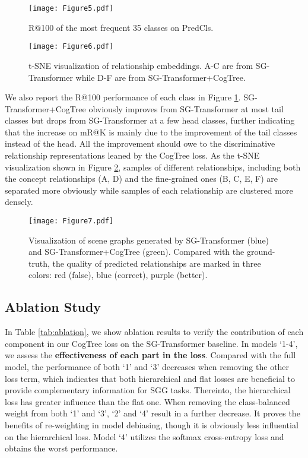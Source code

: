 \documentclass[letterpaper]{article} \usepackage{aaai21}  \usepackage{times}  \usepackage{helvet} \usepackage{courier}  \usepackage[hyphens]{url}  \usepackage{graphicx} \urlstyle{rm} \def\UrlFont{\rm}  \usepackage{natbib}  \usepackage{caption} \frenchspacing  \setlength{\pdfpagewidth}{8.5in}  \setlength{\pdfpageheight}{11in}  \usepackage{amsmath,amsthm}
\begin{document}
\begin{figure}[t]
    \centering
    \texttt{[image: Figure5.pdf]}
    \caption{R@100 of the most frequent 35 classes on PredCls.}
    \label{fig:recall}
\end{figure}

\begin{figure}[t]
    \centering
    \texttt{[image: Figure6.pdf]}
    \caption{t-SNE visualization of relationship embeddings. A-C are from SG-Transformer while D-F are from SG-Transformer+CogTree.}
    \label{fig:tsne}
\end{figure}


We also report the R@100 performance of each class in Figure \ref{fig:recall}. SG-Transformer+CogTree obviously improves from SG-Transformer at most tail classes but drops from SG-Transformer at a few head classes, further indicating that the increase on mR@K is mainly due to the improvement of the tail classes instead of the head. All the improvement should owe to the discriminative relationship representations leaned by the CogTree loss. As the t-SNE visualization shown in Figure \ref{fig:tsne}, samples of different relationships, including both the concept relationships (A, D) and the fine-grained ones (B, C, E, F) are separated more obviously while samples of each relationship are clustered more densely. 




\begin{figure*}[t]
    \centering
    \texttt{[image: Figure7.pdf]}
    \caption{Visualization of scene graphs generated by SG-Transformer (blue) and SG-Transformer+CogTree (green). Compared with the ground-truth, the quality of predicted relationships are marked in three colors: red (false), blue (correct), purple (better).}
    \label{fig:cases}
\end{figure*}










\subsection{Ablation Study}
In Table \ref{tab:ablation}, we show ablation results to verify the contribution of each component in our CogTree loss on the SG-Transformer baseline. In models `1-4’, we assess the \textbf{effectiveness of each part in the loss}. Compared with the full model, the performance of both `1’ and `3’ decreases when removing the other loss term, which indicates that both hierarchical and flat losses are beneficial to provide complementary information for SGG tasks. Thereinto, the hierarchical loss has greater influence than the flat one. When removing the class-balanced weight from both `1’ and `3’, `2' and `4' result in a further decrease. It proves the benefits of re-weighting in model debiasing, though it is obviously less influential on the  hierarchical loss. Model `4' utilizes the softmax cross-entropy loss and obtains the worst performance. 
\end{document}
